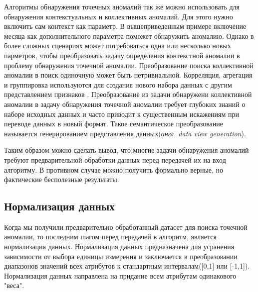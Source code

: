 Алгоритмы обнаружения точечных аномалий так же можно использовать для обнаружения контекстуальных и коллективных аномалий. Для этого нужно включить сам контекст как параметр. В вышеприведенным примере включение месяца как дополнительного параметра поможет обнаружить аномалию. Однако в более сложных сценариях может потребоваться одна или несколько новых парметров, чтобы преобразовать задачу определения контекстной аномалии в проблему обнаружения точечной аномалии. Преобразование поиска коллективной аномалии в поиск одиночную может быть нетривиальной. Корреляция, агрегация и группировка используются  для создания нового набора данных с другим представлением признаков\cite{Book05} . Преобразование из задачи обнаружени коллективной аномалии в задачу обнаружения точечной аномалии требует глубоких знаний о наборе исходных данных и часто приводит  к существенным искажениям при переводе данных в новый формат. Такое семантическое преобразование называется  генерированием представления данных(\textit{англ. data view generation}).
  
  Таким образом можно сделать вывод, что многие задачи обнаружения аномалий требуют предварительной обработки данных перед передачей их на вход алгоритму. В противном случае можно получить формально верные, но фактические бесполезные результаты.
\subsection{Нормализация данных} 
Когда мы получили предварительно обработанный  датасет для поиска точечной аномалии, то последним шагом перед передачей в алгоритм, является нормализация данных. Нормализация данных предназначена для усранения зависимости от выбора единицы измерения и заключается в преобразовании диапазонов значений всех атрибутов к стандартным интервалам([0,1] или [-1,1])\cite{Book06}. Нормализация данных направлена на придание всем атрибутам одинакового "веса".
